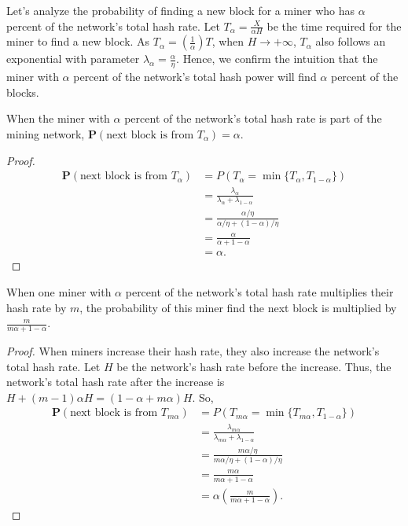 Let's analyze the probability of finding a new block for a miner who has $\alpha$ percent of the network's total hash rate. Let $T_\alpha = \frac{X}{\alpha H}$ be the time required for the miner to find a new block. As $T_\alpha = \left( \frac{1}{\alpha} \right) T$, when $H \rightarrow +\infty$, $T_\alpha$ also follows an exponential with parameter $\lambda_\alpha = \frac{\alpha}{\eta}$. Hence, we confirm the intuition that the miner with $\alpha$ percent of the network's total hash power will find $\alpha$ percent of the blocks.

\begin{theorem}
	When the miner with $\alpha$ percent of the network's total hash rate is part of the mining network, $\mathbf{P}(\text{next block is from $T_\alpha$}) = \alpha.$
\end{theorem}
\begin{proof}
\begin{align*}
	\mathbf{P}(\text{next block is from $T_\alpha$}) &= P \left( T_\alpha = \min\{T_\alpha, T_{1-\alpha}\} \right) \\
		&= \frac{\lambda_\alpha}{\lambda_\alpha + \lambda_{1-\alpha}} \\
		&= \frac{\alpha/\eta}{\alpha/\eta + (1-\alpha)/\eta} \\
		&= \frac{\alpha}{\alpha + 1 - \alpha} \\
		&= \alpha.
\end{align*}
\end{proof}

\begin{theorem}
	When one miner with $\alpha$ percent of the network's total hash rate multiplies their hash rate by $m$, the probability of this miner find the next block is multiplied by $\frac{m}{m \alpha + 1 - \alpha}$.
	\label{thm-miner-multiply}
\end{theorem}
\begin{proof}
	When miners increase their hash rate, they also increase the network's total hash rate. Let $H$ be the network's hash rate before the increase. Thus, the network's total hash rate after the increase is $H + (m-1) \alpha H = (1 - \alpha + m \alpha) H$. So,
\begin{align*}
	\mathbf{P}(\text{next block is from $T_{m \alpha}$}) &= P \left( T_{m \alpha} = \min\{T_{m \alpha}, T_{1-\alpha}\} \right) \\
		&= \frac{\lambda_{m \alpha}}{\lambda_{m \alpha} + \lambda_{1-\alpha}} \\
		&= \frac{m \alpha/\eta}{m \alpha/\eta + (1-\alpha)/\eta} \\
		&= \frac{m \alpha}{m \alpha + 1-\alpha} \\
		&= \alpha \left( \frac{m}{m \alpha + 1 - \alpha} \right).
\end{align*}
\end{proof}

